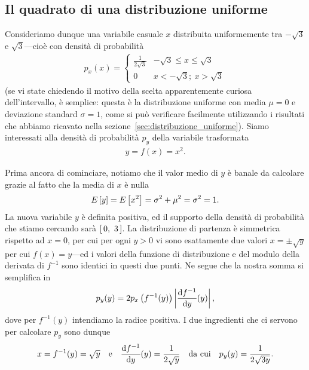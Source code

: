 \subsection{Il quadrato di una distribuzione uniforme}
\label{sec:pdf_quadrato_uniforme}

Consideriamo dunque una variabile casuale $x$ distribuita uniformemente tra
$-\sqrt{3}$ e $\sqrt{3}$---cioè con densità di probabilità
\begin{align*}
  p_x(x) = \left \{ \begin{array}{ll}
    \frac{\displaystyle 1}{\displaystyle 2\sqrt{3}} &
    -\sqrt{3} \leq x \leq \sqrt{3}\\
    0 & x < -\sqrt{3} ; ~ x > \sqrt{3}
  \end{array} \right.
\end{align*}
(se vi state chiedendo il motivo della scelta apparentemente curiosa
dell'intervallo, è semplice: questa è la distribuzione uniforme con media
$\mu = 0$ e deviazione standard $\sigma = 1$, come si può verificare
facilmente utilizzando i risultati che abbiamo ricavato nella
sezione~\ref{sec:distribuzione_uniforme}). Siamo interessati alla densità di
probabilità $p_y$ della variabile trasformata
\begin{align*}
  y = f(x) = x^2.
\end{align*}

Prima ancora di cominciare, notiamo che il valor medio di $y$ è banale da
calcolare grazie al fatto che la media di $x$ è nulla
\begin{align*}
  \displaystyle E\left[y\right] = \displaystyle E\left[x^2\right] = \sigma^2 + \mu^2 = \sigma^2 = 1.
\end{align*}
La nuova variabile $y$ è definita positiva, ed il supporto della densità di
probabilità che stiamo cercando sarà $\left[\, 0,~3 \,\right]$. La distribuzione
di partenza è simmetrica rispetto ad $x = 0$, per cui per ogni $y > 0$ vi
sono esattamente due valori $x = \pm \sqrt{y}$ per cui $f(x) = y$---ed i valori
della funzione di distribuzione e del modulo della derivata di $f^{-1}$ sono
identici in questi due punti. Ne segue che la nostra somma si semplifica in
\begin{align*}
  p_y(y) = 2 p_x\left(f^{-1}(y)\right)\abs{\td{f^{-1}}{y}{y}},
\end{align*}
dove per $f^{-1}(y)$ intendiamo la radice positiva. I due ingredienti che ci
servono per calcolare $p_y$ sono dunque
\begin{align}
  x = f^{-1}(y) = \sqrt{y} \quad \text{e} \quad
  \td{f^{-1}}{y}{y} = \frac{1}{2\sqrt{y}} \quad \text{da cui} \quad
  p_y(y) = \frac{1}{2\sqrt{3y}}.
\end{align}

